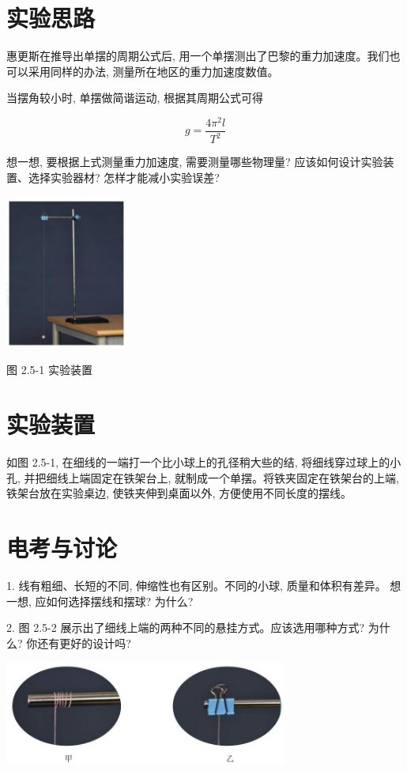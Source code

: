 \documentclass[10pt]{article}
\begin{document}
\section*{实验思路}

惠更斯在推导出单摆的周期公式后, 用一个单摆测出了巴黎的重力加速度。我们也可以采用同样的办法, 测量所在地区的重力加速度数值。

当摆角较小时, 单摆做简谐运动, 根据其周期公式可得

\[
g = \frac{4{\pi }^{2}l}{{T}^{2}}
\]

想一想, 要根据上式测量重力加速度, 需要测量哪些物理量? 应该如何设计实验装置、选择实验器材? 怎样才能减小实验误差?

\begin{center}
\includegraphics[max width=0.3\textwidth]{images/01910e4c-ebb8-7d2c-8f2f-2375bc1d2d12_56_160378.jpg}
\end{center}

图 2.5-1 实验装置

\section*{实验装置}

如图 2.5-1, 在细线的一端打一个比小球上的孔径稍大些的结, 将细线穿过球上的小孔, 并把细线上端固定在铁架台上, 就制成一个单摆。将铁夹固定在铁架台的上端, 铁架台放在实验桌边, 使铁夹伸到桌面以外, 方便使用不同长度的摆线。

\section*{电考与讨论}

1. 线有粗细、长短的不同, 伸缩性也有区别。不同的小球, 质量和体积有差异。 想一想, 应如何选择摆线和摆球? 为什么?

2. 图 2.5-2 展示出了细线上端的两种不同的悬挂方式。应该选用哪种方式? 为什么? 你还有更好的设计吗?

\begin{center}
\includegraphics[max width=0.7\textwidth]{images/01910e4c-ebb8-7d2c-8f2f-2375bc1d2d12_57_676429.jpg}
\end{center}
\end{document}
